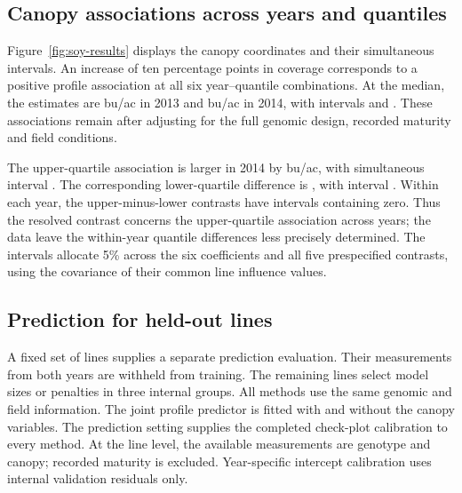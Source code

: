 \subsection{Canopy associations across years and quantiles}

Figure~\ref{fig:soy-results} displays the canopy coordinates and their
simultaneous intervals. An increase of ten percentage points in
coverage corresponds to a positive profile association at all six
year--quantile combinations. At the median, the estimates are
\SoyMedianThirteen{} bu/ac in 2013 and \SoyMedianFourteen{} bu/ac in
2014, with intervals \SoyMedianThirteenInterval{} and
\SoyMedianFourteenInterval{}. These associations remain after adjusting
for the full genomic design, recorded maturity and field conditions.

The upper-quartile association is larger in 2014 by
\SoyUpperYearDifference{} bu/ac, with simultaneous interval
\SoyUpperYearDifferenceInterval{}. The corresponding lower-quartile
difference is \SoyLowerYearDifference{}, with interval
\SoyLowerYearDifferenceInterval{}. Within each year, the upper-minus-lower
contrasts have intervals containing zero. Thus the resolved contrast
concerns the upper-quartile association across years; the data leave
the within-year quantile differences less precisely determined.
The intervals allocate 5\% across the six coefficients and all five
prespecified contrasts, using the covariance of their common line
influence values.



\subsection{Prediction for held-out lines}

A fixed set of \SoyTestLines{} lines supplies a separate prediction
evaluation. Their measurements from both years are withheld from
training. The remaining \SoyTrainingLines{} lines select model sizes
or penalties in three internal groups. All methods use the same
genomic and field information. The joint profile predictor is fitted
with and without the canopy variables. The prediction setting supplies the completed
check-plot calibration to every method. At the line level, the available
measurements are genotype and canopy; recorded maturity is excluded.
Year-specific intercept calibration uses internal validation residuals only.



